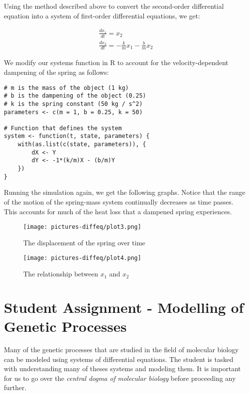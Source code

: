 Using the method described above to convert the second-order differential equation into a system of first-order differential equations, we get:

\begin{gather*}
\frac{dx_1}{dt}=x_2\\
\frac{dx_2}{dt}=-\frac{k}{m}x_1 - \frac{b}{m}x_2
\end{gather*}

We modify our systems function in R to account for the velocity-dependent dampening of the spring as follows:

\begin{lstlisting}
# m is the mass of the object (1 kg)
# b is the dampening of the object (0.25)
# k is the spring constant (50 kg / s^2)
parameters <- c(m = 1, b = 0.25, k = 50)

# Function that defines the system
system <- function(t, state, parameters) {
    with(as.list(c(state, parameters)), {
        dX <- Y
        dY <- -1*(k/m)X - (b/m)Y
    })
}
\end{lstlisting}

Running the simulation again, we get the following graphs. Notice that the range of the motion of the spring-mass system continually decreases as time passes. This accounts for much of the heat loss that a dampened spring experiences. 

\begin{figure}[H]
    \centering
    \texttt{[image: pictures-diffeq/plot3.png]}
    \caption{The displacement of the spring over time}
\end{figure}

\begin{figure}[H]
    \centering
    \texttt{[image: pictures-diffeq/plot4.png]}
    \caption{The relationship between $x_1$ and $x_2$}
\end{figure}

\section{Student Assignment - Modelling of Genetic Processes}

Many of the genetic processes that are studied in the field of molecular biology can be modeled using systems of differential equations. The student is tasked with understanding many of theses systems and modeling them. It is important for us to go over the \textit{central dogma of molecular biology} before proceeding any further.\\

